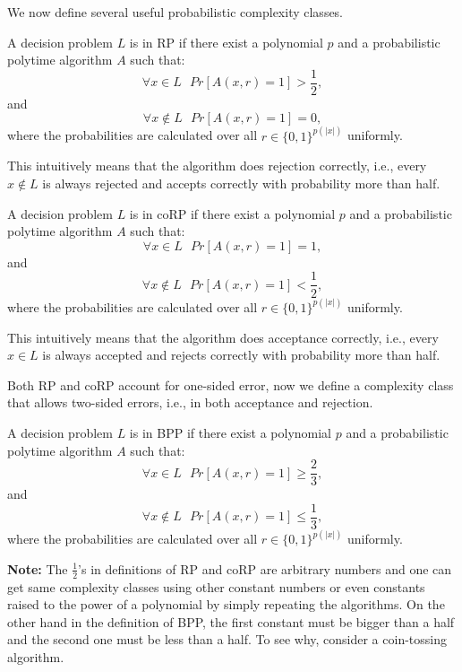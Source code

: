 We now define several useful probabilistic complexity classes.

\begin{definition} \label{rpdef}
A decision problem $L$ is in RP if there exist a polynomial $p$ and a probabilistic polytime algorithm $A$ such that:
$$\forall x \in L ~~~ Pr[A(x, r) = 1] > \frac{1}{2},$$ and $$\forall x \not \in L ~~~ Pr[A(x, r) = 1] = 0,$$
where the probabilities are calculated over all $r \in \{0, 1\}^{p(\vert x \vert)}$ uniformly.

This intuitively means that the algorithm does rejection correctly, i.e., every $x \not \in L$ is always rejected and accepts correctly with probability more than half.
\end{definition}

\begin{definition}[coRP] 
A decision problem $L$ is in coRP if there exist a polynomial $p$ and a probabilistic polytime algorithm $A$ such that:
$$\forall x \in L ~~~ Pr[A(x, r) = 1] = 1,$$ and $$\forall x \not \in L ~~~ Pr[A(x, r) = 1] < \frac{1}{2},$$
where the probabilities are calculated over all $r \in \{0, 1\}^{p(\vert x \vert)}$ uniformly.

This intuitively means that the algorithm does acceptance correctly, i.e., every $x \in L$ is always accepted and rejects correctly with probability more than half.
\end{definition}

Both RP and coRP account for one-sided error, now we define a complexity class that allows two-sided errors, i.e., in both acceptance and rejection.

\begin{definition} 
A decision problem $L$ is in BPP if there exist a polynomial $p$ and a probabilistic polytime algorithm $A$ such that:
$$\forall x \in L ~~~ Pr[A(x, r) = 1] \geq \frac{2}{3},$$ and $$\forall x \not \in L ~~~ Pr[A(x, r) = 1] \leq \frac{1}{3},$$
where the probabilities are calculated over all $r \in \{0, 1\}^{p(\vert x \vert)}$ uniformly.
\end{definition}

\textbf{Note:} The $\frac{1}{2}$'s in definitions of RP and coRP are arbitrary numbers and one can get same complexity classes using other constant numbers or even constants raised to the power of a polynomial by simply repeating the algorithms. On the other hand in the definition of BPP, the first constant must be bigger than a half and the second one must be less than a half. To see why, consider a coin-tossing algorithm.


